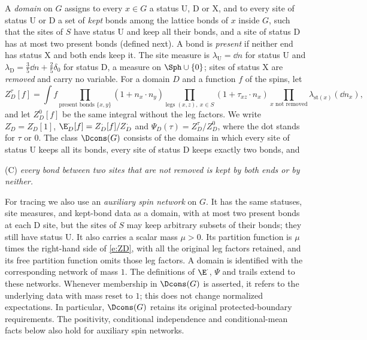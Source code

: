 \begin{definition}\label{d:domain}
A \emph{domain} on $G$ assigns to every $x \in G$ a status $\mathrm{U}$, $\mathrm{D}$ or $\mathrm{X}$, and to every site of status $\mathrm U$ or $\mathrm D$ a set of \emph{kept} bonds among the lattice bonds of $x$ inside $G$, such that the sites of $S$ have status $\mathrm U$ and keep all their bonds, and a site of status $\mathrm D$ has at most two present bonds (defined next). A bond is \emph{present} if neither end has status $\mathrm X$ and both ends keep it. The site measure is $\lambda_{\mathrm U} = \dd n$ for status $\mathrm U$ and $\lambda_{\mathrm D} = \frac35 \dd n + \frac25 \delta_0$ for status $\mathrm D$, a measure on $\Sph \cup \{0\}$; sites of status $\mathrm X$ are \emph{removed} and carry no variable. For a domain $D$ and a function $f$ of the spins, let
\begin{equation}\label{e:ZD}
Z^\tau_D[f] = \int f \prod_{\text{present bonds } \{x, y\}} (1 + n_x \cdot n_y) \prod_{\text{legs } (x, z), \ x \in S} (1 + \tau_{xz} \cdot n_x) \prod_{x \text{ not removed}} \lambda_{\mathrm{st}(x)}(\dd n_x),
\end{equation}
and let $Z^0_D[f]$ be the same integral without the leg factors. We write $Z^\cdot_D = Z^\cdot_D[1]$, $\E^\cdot_D[f] = Z^\cdot_D[f] / Z^\cdot_D$ and $\Psi_D(\tau) = Z^\tau_D / Z^0_D$, where the dot stands for $\tau$ or $0$. The class $\Dcons(G)$ consists of the domains in which every site of status $\mathrm U$ keeps all its bonds, every site of status $\mathrm D$ keeps exactly two bonds, and

(C) \emph{every bond between two sites that are not removed is kept by both ends or by neither.}
\end{definition}
For tracing we also use an \emph{auxiliary spin network} on $G$. It has
the same statuses, site measures, and kept-bond data as a domain, with at
most two present bonds at each $\mathrm D$ site, but the sites of $S$
may keep arbitrary subsets of their bonds; they still have status
$\mathrm U$. It also carries a scalar mass $\mu>0$. Its partition
function is $\mu$ times the right-hand side of \eqref{e:ZD}, with all
the original leg factors retained, and its free partition function omits
those leg factors. A domain is identified with the corresponding network
of mass $1$. The definitions of $\E^\cdot$, $\Psi$ and trails extend to
these networks. Whenever membership in $\Dcons(G)$ is asserted, it refers
to the underlying data with mass reset to $1$; this does not change
normalized expectations. In particular, $\Dcons(G)$ retains its original
protected-boundary requirements. The positivity, conditional independence
and conditional-mean facts below also hold for auxiliary spin networks.

